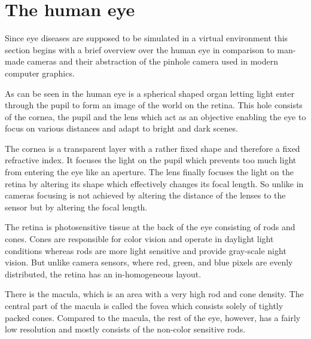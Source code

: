 \documentclass{sig-alternate-05-2015}
\begin{document}
\section{The human eye}
Since eye diseases are supposed to be simulated in a virtual environment this section begins with a brief overview over the human eye in comparison to man-made cameras and their abstraction of the pinhole camera used in modern computer graphics.

As can be seen in  the human eye is a spherical shaped organ letting light enter through the pupil to form an image of the world on the retina.
This hole consists of the cornea, the pupil and the lens which act as an objective enabling the eye to focus on various distances and adapt to bright and dark scenes.

The cornea is a transparent layer with a rather fixed shape and therefore a fixed refractive index.
It focuses the light on the pupil which prevents too much light from entering the eye like an aperture.
The lens finally focuses the light on the retina by altering its shape which effectively changes its focal length.
So unlike in cameras focusing is not achieved by altering the distance of the lenses to the sensor but by altering the focal length.

The retina is photosensitive tissue at the back of the eye consisting of rods and cones.
Cones are responsible for color vision and operate in daylight light conditions whereas rods are more light sensitive and provide gray-scale night vision.
But unlike camera sensors, where red, green, and blue pixels are evenly distributed, the retina has an in-homogeneous layout.

There is the macula, which is an area with a very high rod and cone density.
The central part of the macula is called the fovea which consists solely of tightly packed cones.
Compared to the macula, the rest of the eye, however, has a fairly low resolution and mostly consists of the non-color sensitive rods.
\end{document}
